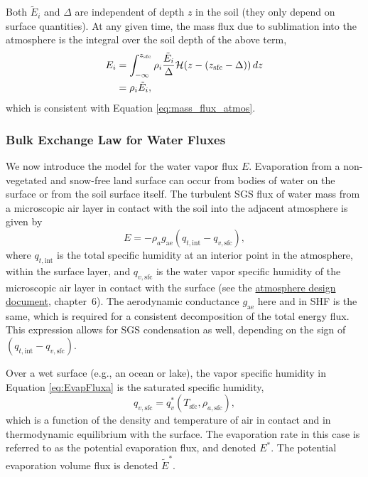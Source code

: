 \documentclass[twoside,10pt]{report}
\begin{document}
Both $\tilde{E}_i$ and $\Delta$ are independent of depth $z$ in the soil (they only depend on surface quantities). At any given time, the mass flux due to sublimation into the atmosphere is the integral over the soil depth of the above term,
\begin{align}
    E_{i} &= \int_{-\infty}^{z_{\rm sfc}} \rho_i \frac{\tilde{E}_{i}}{\Delta} \mathcal{H}(z-(z_{\mathrm{sfc}} - \Delta)) \, dz \nonumber \\
    & = \rho_i \tilde{E}_{i},
\end{align}
which is consistent with Equation \eqref{eq:mass_flux_atmos}. 

\subsubsection{Bulk Exchange Law for Water Fluxes}

We now introduce the model for the water vapor flux $E$. Evaporation from a non-vegetated and snow-free land surface can occur from bodies of water on the surface or from the soil surface itself. The turbulent SGS flux of water mass from a microscopic air layer in contact with the soil into the adjacent atmosphere is given by
\begin{equation}\label{eq:EvapFluxa}
E = -\rho_a g_{\mathrm{ae}} (q_{t, \mathrm{int}}-q_{v,\mathrm{sfc}}),
\end{equation}
where $q_{t, \mathrm{int}}$ is the total specific humidity at an interior point in the atmosphere, within the surface layer, and $q_{v,\mathrm{sfc}}$ is the water vapor specific humidity of the microscopic air layer in contact with the surface (see the \href{https://github.com/climate-machine/Design-Docs/blob/master/CLIMA-atmos/}{atmosphere design document}, chapter~6). The aerodynamic conductance $g_{\mathrm{ae}}$ here and in SHF is the same, which is required for a consistent decomposition of the total energy flux. This expression allows for SGS condensation as well, depending on the sign of $(q_{t, \mathrm{int}}-q_{v,\mathrm{sfc}})$. 

Over a wet surface (e.g., an ocean or lake), the vapor specific humidity in Equation \eqref{eq:EvapFluxa} is the saturated specific humidity,
\begin{equation}
    q_{v,\mathrm{sfc}} = q_v^*(T_\mathrm{sfc}, \rho_{a, \mathrm{sfc}}),
\end{equation}
which is a function of the density and temperature of air in contact and in thermodynamic equilibrium with the surface. The evaporation rate in this case is referred to as the potential evaporation flux, and denoted $E^*$. The potential evaporation volume flux is denoted $\tilde{E}^*$. 
\end{document}
